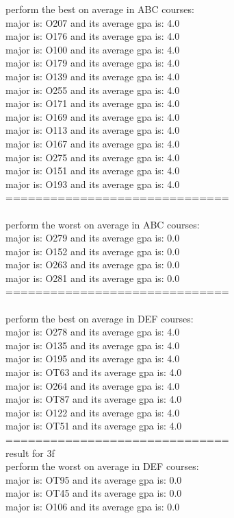perform the best on average in ABC courses: \\
major is: O207 and its average gpa is: 4.0\\
major is: O176 and its average gpa is: 4.0\\
major is: O100 and its average gpa is: 4.0\\
major is: O179 and its average gpa is: 4.0\\
major is: O139 and its average gpa is: 4.0\\
major is: O255 and its average gpa is: 4.0\\
major is: O171 and its average gpa is: 4.0\\
major is: O169 and its average gpa is: 4.0\\
major is: O113 and its average gpa is: 4.0\\
major is: O167 and its average gpa is: 4.0\\
major is: O275 and its average gpa is: 4.0\\
major is: O151 and its average gpa is: 4.0\\
major is: O193 and its average gpa is: 4.0\\
==============================\\
\\
perform the worst on average in ABC courses: \\
major is: O279 and its average gpa is: 0.0\\
major is: O152 and its average gpa is: 0.0\\
major is: O263 and its average gpa is: 0.0\\
major is: O281 and its average gpa is: 0.0\\
==============================\\
\\
perform the best on average in DEF courses: \\
major is: O278 and its average gpa is: 4.0\\
major is: O135 and its average gpa is: 4.0\\
major is: O195 and its average gpa is: 4.0\\
major is: OT63 and its average gpa is: 4.0\\
major is: O264 and its average gpa is: 4.0\\
major is: OT87 and its average gpa is: 4.0\\
major is: O122 and its average gpa is: 4.0\\
major is: OT51 and its average gpa is: 4.0\\
==============================\\
result for 3f\\
perform the worst on average in DEF courses: \\
major is: OT95 and its average gpa is: 0.0\\
major is: OT45 and its average gpa is: 0.0\\
major is: O106 and its average gpa is: 0.0\\
